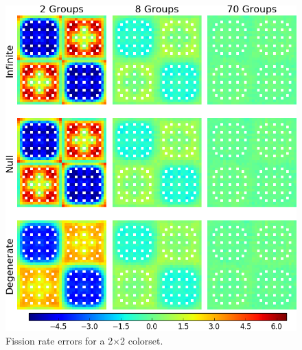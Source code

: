 \begin{figure}[h!]
\centering
\includegraphics[width=\linewidth]{figures/quantification/2x2/fiss-err}
\caption[Fission rate errors for a 2$\times$2 colorset]{Fission rate errors for a 2$\times$2 colorset.}
\label{fig:chap8-2x2-fiss-err}
\end{figure}

